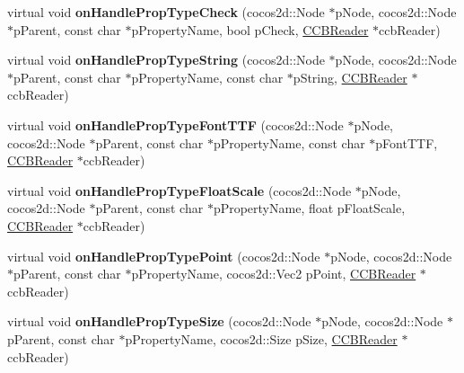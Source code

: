 \begin{DoxyCompactItemize}
virtual void {\bfseries on\+Handle\+Prop\+Type\+Check} (cocos2d\+::\+Node $\ast$p\+Node, cocos2d\+::\+Node $\ast$p\+Parent, const char $\ast$p\+Property\+Name, bool p\+Check, \hyperlink{classcocosbuilder_1_1CCBReader}{C\+C\+B\+Reader} $\ast$ccb\+Reader)
\item 
\mbox{\label{classcocosbuilder_1_1ControlButtonLoader_a19ece917909d9960d21aa2ff25bf25f2}} 
virtual void {\bfseries on\+Handle\+Prop\+Type\+String} (cocos2d\+::\+Node $\ast$p\+Node, cocos2d\+::\+Node $\ast$p\+Parent, const char $\ast$p\+Property\+Name, const char $\ast$p\+String, \hyperlink{classcocosbuilder_1_1CCBReader}{C\+C\+B\+Reader} $\ast$ccb\+Reader)
\item 
\mbox{\label{classcocosbuilder_1_1ControlButtonLoader_acf96823ea8bd5a2a4b48fbe3bad8e78a}} 
virtual void {\bfseries on\+Handle\+Prop\+Type\+Font\+T\+TF} (cocos2d\+::\+Node $\ast$p\+Node, cocos2d\+::\+Node $\ast$p\+Parent, const char $\ast$p\+Property\+Name, const char $\ast$p\+Font\+T\+TF, \hyperlink{classcocosbuilder_1_1CCBReader}{C\+C\+B\+Reader} $\ast$ccb\+Reader)
\item 
\mbox{\label{classcocosbuilder_1_1ControlButtonLoader_ad12eda64cb92ba5957cf754a04818af8}} 
virtual void {\bfseries on\+Handle\+Prop\+Type\+Float\+Scale} (cocos2d\+::\+Node $\ast$p\+Node, cocos2d\+::\+Node $\ast$p\+Parent, const char $\ast$p\+Property\+Name, float p\+Float\+Scale, \hyperlink{classcocosbuilder_1_1CCBReader}{C\+C\+B\+Reader} $\ast$ccb\+Reader)
\item 
\mbox{\label{classcocosbuilder_1_1ControlButtonLoader_aca92535deecc3300e43f96ee7851f45b}} 
virtual void {\bfseries on\+Handle\+Prop\+Type\+Point} (cocos2d\+::\+Node $\ast$p\+Node, cocos2d\+::\+Node $\ast$p\+Parent, const char $\ast$p\+Property\+Name, cocos2d\+::\+Vec2 p\+Point, \hyperlink{classcocosbuilder_1_1CCBReader}{C\+C\+B\+Reader} $\ast$ccb\+Reader)
\item 
\mbox{\label{classcocosbuilder_1_1ControlButtonLoader_a7184f3dcd5f2e73b587e4516ca771916}} 
virtual void {\bfseries on\+Handle\+Prop\+Type\+Size} (cocos2d\+::\+Node $\ast$p\+Node, cocos2d\+::\+Node $\ast$p\+Parent, const char $\ast$p\+Property\+Name, cocos2d\+::\+Size p\+Size, \hyperlink{classcocosbuilder_1_1CCBReader}{C\+C\+B\+Reader} $\ast$ccb\+Reader)

\end{DoxyCompactItemize}

